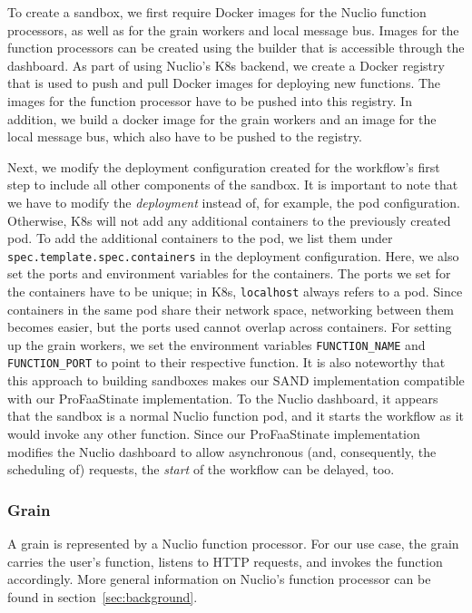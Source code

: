 To create a sandbox, we first require Docker images for the Nuclio function processors, as well as for the grain workers and local message bus.
Images for the function processors can be created using the builder that is accessible through the dashboard. 
As part of using Nuclio's K8s backend, we create a Docker registry that is used to push and pull Docker images for deploying new functions.
The images for the function processor have to be pushed into this registry.
In addition, we build a docker image for the grain workers and an image for the local message bus, which also have to be pushed to the registry.

Next, we modify the deployment configuration created for the workflow's first step to include all other components of the sandbox.
It is important to note that we have to modify the \emph{deployment} instead of, for example, the pod configuration. 
Otherwise, K8s will not add any additional containers to the previously created pod.
To add the additional containers to the pod, we list them under \texttt{spec.template.spec.containers} in the deployment configuration.
Here, we also set the ports and environment variables for the containers. 
The ports we set for the containers have to be unique; in K8s, \texttt{localhost} always refers to a pod.
Since containers in the same pod share their network space, networking between them becomes easier, but the ports used cannot overlap across containers.
For setting up the grain workers, we set the environment variables \texttt{FUNCTION\_NAME} and \texttt{FUNCTION\_PORT} to point to their respective function. 
It is also noteworthy that this approach to building sandboxes makes our SAND implementation compatible with our ProFaaStinate implementation.
To the Nuclio dashboard, it appears that the sandbox is a normal Nuclio function pod, and it starts the workflow as it would invoke any other function. 
Since our ProFaaStinate implementation modifies the Nuclio dashboard to allow asynchronous (and, consequently, the scheduling of) requests, the \emph{start} of the workflow can be delayed, too.

\subsubsection{Grain}

A grain is represented by a Nuclio function processor. 
For our use case, the grain carries the user's function, listens to HTTP requests, and invokes the function accordingly.
More general information on Nuclio's function processor can be found in section~\ref{sec:background}. %

